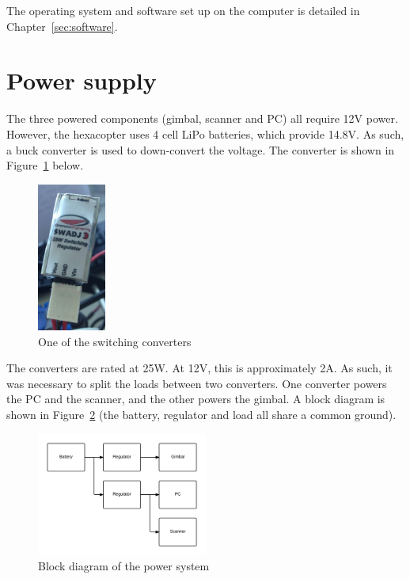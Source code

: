 \documentclass[12pt,oneside,a4paper]{book}
\begin{document}
The operating system and software set up on the computer is detailed
in Chapter~\ref{sec:software}.
\newpage
\section{Power supply}
\label{sec:power-supply-cons}

The three powered components (gimbal, scanner and PC) all require 12V
power. However, the hexacopter uses 4 cell LiPo batteries, which
provide 14.8V. As such, a buck converter is used to down-convert the
voltage. The converter is shown in
Figure~\ref{fig:converter} below.

\begin{figure}[h!]
  \centering
  \includegraphics[width=0.2\textwidth]{figs/converter}
  \caption{One of the switching converters}
  \label{fig:converter}
\end{figure}

The converters are rated at 25W. At 12V, this is approximately 2A. As
such, it was necessary to split the loads between two converters. One
converter powers the PC and the scanner, and the other powers the
gimbal. A block diagram is shown in Figure~\ref{fig:power} (the
battery, regulator and load all share a common ground).

\begin{figure}[h!]
  \centering
  \includegraphics[width=0.5\textwidth]{figs/power}
  \caption{Block diagram of the power system}
  \label{fig:power}
\end{figure}
\end{document}
